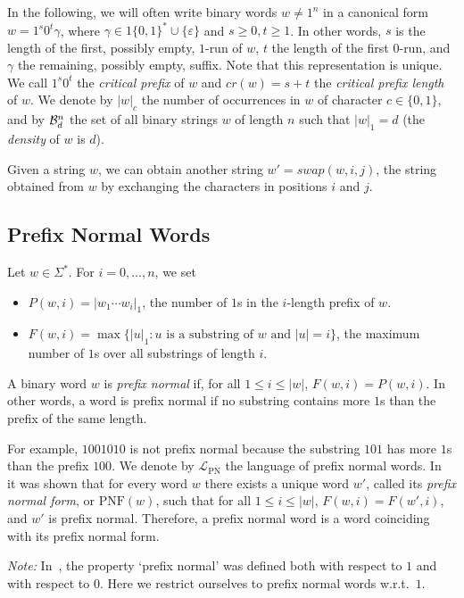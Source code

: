 \documentclass[11pt,a4paper]{llncs}
\def\swap{\textit{swap}}
\renewcommand{\epsilon}{\varepsilon}
\newcommand{\PNF}{\mathrm{PNF}}
\newcommand{\LPN}{{\mathcal L}_{\textrm{PN}}}
\begin{document}
In the following, we will often write binary words $w\neq 1^n$ in a canonical form $w=1^s0^t\gamma$, where $\gamma\in 1\{0,1\}^* \cup \{\epsilon\}$ and $s\geq 0, t\geq1$. In other words, $s$ is the length of the first, possibly empty, $1$-run of $w$, $t$ the length of the first $0$-run, and $\gamma$ the remaining, possibly empty, suffix. Note that this representation is unique. We call $1^s0^t$ the {\em critical prefix} of $w$ and $cr(w)=s+t$ the {\em critical prefix length} of $w$. We denote by $|w|_c$ the number of occurrences in $w$ of character $c\in\{0,1\}$, and by ${\cal B}^n_d$ the set of all binary strings $w$ of length $n$ such that $|w|_1 = d$ (the  {\em density} of $w$ is $d$). 

Given a string $w$, we can obtain another string $w' = \swap(w,i,j)$, the string obtained from $w$ by exchanging the characters in positions $i$ and $j$. 

\subsection{Prefix Normal Words}\label{sec:pnw}

Let $w\in \Sigma^*$. For $i=0,\ldots,n$, we set 
\begin{itemize}
\item $P(w,i) = |w_1\cdots w_i|_1$, the number of $1$s in the $i$-length prefix of $w.$
\item $F(w,i) = \max \{|u|_1 : u \text{ is a substring of } w \text{ and } |u|=i\}$, the maximum number of $1$s over all substrings of length $i$. 
\end{itemize}

\begin{definition} 
A binary word $w$ is {\em prefix normal} if, for all $1\leq i \leq |w|$, $F(w,i) = P(w,i)$. In other words, a word is prefix normal if no substring contains more $1$s than the prefix of the same length.
\end{definition}

For example, $1001010$ is not prefix normal because the substring $101$ has more $1$s than the prefix $100$. We denote by $\LPN$ the language of prefix normal words. In~\cite{FL11} it was shown that for every word $w$ there exists a unique word $w'$, called its {\em prefix normal form}, or $\PNF(w)$, such that for all $1\leq i \leq |w|$, $F(w,i) = F(w',i)$, and $w'$ is prefix normal. Therefore, a prefix normal word is a word coinciding with its prefix normal form.

{\em Note:} In~\cite{FL11}, the property `prefix normal' was defined both with respect to $1$ and with respect to $0$. Here we restrict ourselves to prefix normal words w.r.t.\ $1$.
\end{document}
